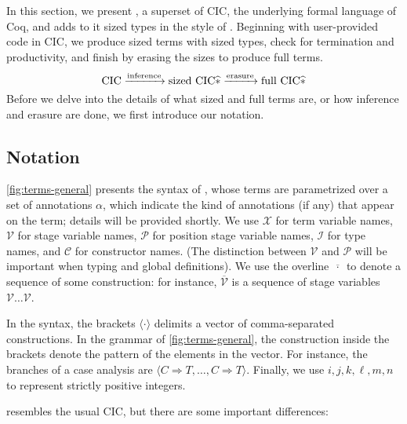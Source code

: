 \documentclass[sigplan,10pt,anonymous,review]{acmart}
\begin{document}
\section{\texorpdfstring{\lang}{CIC\^{}*}}\label{typing}
In this section, we present \lang, a superset of CIC, the underlying formal language of Coq, and adds to it sized types in the style of \CIChat. Beginning with user-provided code in CIC, we produce sized \lang terms with sized types, check for termination and productivity, and finish by erasing the sizes to produce full \lang terms.
\begin{equation*}
    \text{CIC} \xrightarrow{\text{inference}} \text{sized CIC$\widehat{*}$} \xrightarrow{\text{erasure}} \text{full CIC$\widehat{*}$}
\end{equation*}
Before we delve into the details of what sized and full terms are, or how inference and erasure are done, we first introduce our notation.

\subsection{Notation}



\autoref{fig:terms-general} presents the syntax of \lang, whose terms are parametrized over a set of annotations $\alpha$, which indicate the kind of annotations (if any) that appear on the term; details will be provided shortly. We use $\mathcal{X}$ for term variable names, $\mathcal{V}$ for stage variable names, $\mathcal{P}$ for position stage variable names, $\mathcal{I}$ for \coinductive type names, and $\mathcal{C}$ for \coinductive constructor names. (The distinction between $\mathcal{V}$ and $\mathcal{P}$ will be important when typing \cofixpoints and global definitions). We use the overline $\overline{\,\cdot\,}$ to denote a sequence of some construction: for instance, $\overline{\mathcal{V}}$ is a sequence of stage variables $\mathcal{V} \dots 
\mathcal{V}$.

In the syntax, the brackets $\langle \cdot \rangle$ delimits a vector of comma-separated constructions. In the grammar of \autoref{fig:terms-general}, the construction inside the brackets denote the pattern of the elements in the vector. For instance, the branches of a case analysis are $\langle C \Rightarrow T, \dots, C \Rightarrow T \rangle$. Finally, we use $i, j, k, \ell, m, n$ to represent strictly positive integers.

\lang resembles the usual CIC, but there are some important differences:
\end{document}
